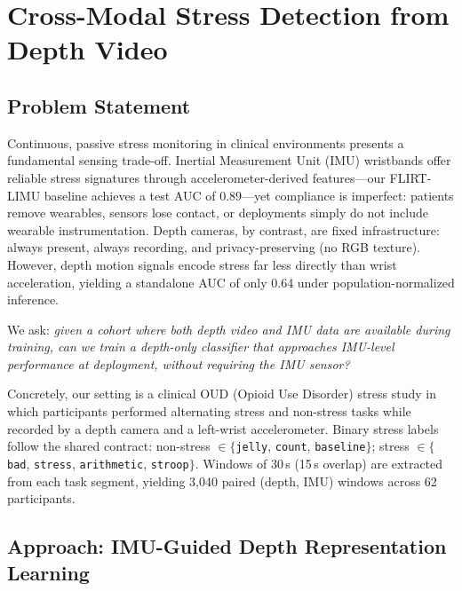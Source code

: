 \documentclass[sigconf,anonymous=false]{acmart}
\begin{document}
\section{Cross-Modal Stress Detection from Depth Video}
\label{sec:cross_modal}

\subsection{Problem Statement}

Continuous, passive stress monitoring in clinical environments presents a
fundamental sensing trade-off.  Inertial Measurement Unit (IMU) wristbands
offer reliable stress signatures through accelerometer-derived features---our
FLIRT-LIMU baseline achieves a test AUC of $0.89$---yet compliance is
imperfect: patients remove wearables, sensors lose contact, or deployments
simply do not include wearable instrumentation.  Depth cameras, by contrast,
are fixed infrastructure: always present, always recording, and
privacy-preserving (no RGB texture).  However, depth motion signals encode
stress far less directly than wrist acceleration, yielding a standalone
AUC of only $0.64$ under population-normalized inference.

We ask: \emph{given a cohort where both depth video and IMU data are available
during training, can we train a depth-only classifier that approaches IMU-level
performance at deployment, without requiring the IMU sensor?}

Concretely, our setting is a clinical OUD (Opioid Use Disorder) stress study
in which participants performed alternating stress and non-stress tasks while
recorded by a depth camera and a left-wrist accelerometer.
Binary stress labels follow the shared contract:
non-stress $\in \{$\texttt{jelly}, \texttt{count}, \texttt{baseline}$\}$;
stress $\in \{$\texttt{bad}, \texttt{stress}, \texttt{arithmetic},
\texttt{stroop}$\}$.
Windows of 30\,s (15\,s overlap) are extracted from each task segment,
yielding 3,040 paired (depth, IMU) windows across 62 participants.

\subsection{Approach: IMU-Guided Depth Representation Learning}
\label{sec:approach}
\end{document}
